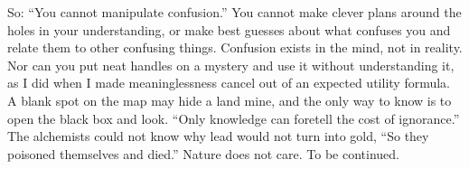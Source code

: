 So: ``You cannot manipulate confusion.'' You cannot make clever plans around the holes in your understanding, or make best guesses about what confuses you and relate them to other confusing things. Confusion exists in the mind, not in reality. Nor can you put neat handles on a mystery and use it without understanding it, as I did when I made meaninglessness cancel out of an expected utility formula. A blank spot on the map may hide a land mine, and the only way to know is to open the black box and look. ``Only knowledge can foretell the cost of ignorance.'' The alchemists could not know why lead would not turn into gold, ``So they poisoned themselves and died.''  Nature does not care. To be continued.
